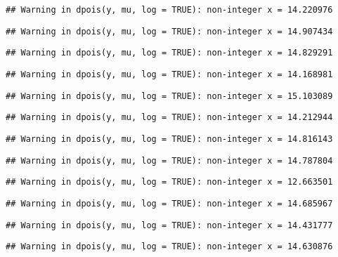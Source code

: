 \documentclass[
]{article}
\begin{document}
\begin{verbatim}
## Warning in dpois(y, mu, log = TRUE): non-integer x = 14.220976
\end{verbatim}

\begin{verbatim}
## Warning in dpois(y, mu, log = TRUE): non-integer x = 14.907434
\end{verbatim}

\begin{verbatim}
## Warning in dpois(y, mu, log = TRUE): non-integer x = 14.829291
\end{verbatim}

\begin{verbatim}
## Warning in dpois(y, mu, log = TRUE): non-integer x = 14.168981
\end{verbatim}

\begin{verbatim}
## Warning in dpois(y, mu, log = TRUE): non-integer x = 15.103089
\end{verbatim}

\begin{verbatim}
## Warning in dpois(y, mu, log = TRUE): non-integer x = 14.212944
\end{verbatim}

\begin{verbatim}
## Warning in dpois(y, mu, log = TRUE): non-integer x = 14.816143
\end{verbatim}

\begin{verbatim}
## Warning in dpois(y, mu, log = TRUE): non-integer x = 14.787804
\end{verbatim}

\begin{verbatim}
## Warning in dpois(y, mu, log = TRUE): non-integer x = 12.663501
\end{verbatim}

\begin{verbatim}
## Warning in dpois(y, mu, log = TRUE): non-integer x = 14.685967
\end{verbatim}

\begin{verbatim}
## Warning in dpois(y, mu, log = TRUE): non-integer x = 14.431777
\end{verbatim}

\begin{verbatim}
## Warning in dpois(y, mu, log = TRUE): non-integer x = 14.630876
\end{verbatim}
\end{document}
